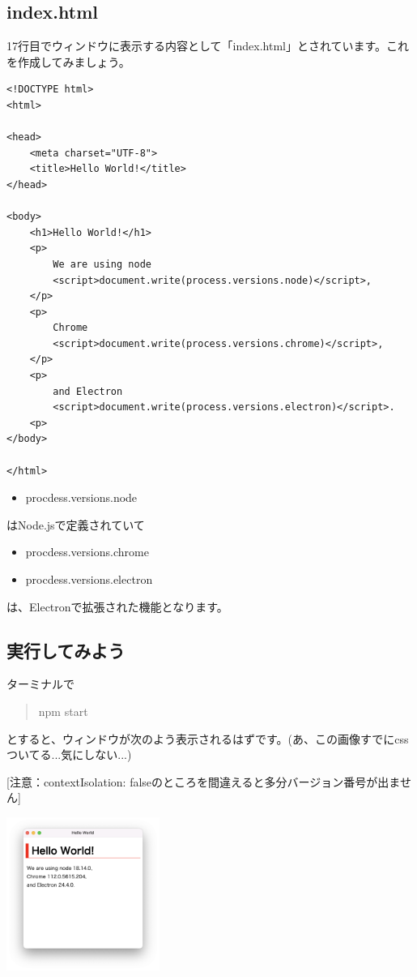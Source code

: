 \documentclass[mingoth,11pt,a4j,uplatex]{jsarticle}
\begin{document}
\subsection{index.html}
17行目でウィンドウに表示する内容として「index.html」とされています。これを作成してみましょう。

\begin{lstlisting}[caption=Hello World：index.html]
<!DOCTYPE html>
<html>

<head>
    <meta charset="UTF-8">
    <title>Hello World!</title>
</head>

<body>
    <h1>Hello World!</h1>
    <p>
        We are using node
        <script>document.write(process.versions.node)</script>,
    </p>
    <p>
        Chrome
        <script>document.write(process.versions.chrome)</script>,
    </p>
    <p>
        and Electron
        <script>document.write(process.versions.electron)</script>.
    <p>
</body>

</html>
\end{lstlisting}

\begin{itemize}
\item procdess.versions.node
\end{itemize}
はNode.jsで定義されていて
\begin{itemize}
\item procdess.versions.chrome
\item procdess.versions.electron
\end{itemize}
は、Electronで拡張された機能となります。

\subsection{実行してみよう}
ターミナルで
\begin{quote}
npm start
\end{quote}
とすると、ウィンドウが次のよう表示されるはずです。(あ、この画像すでにcssついてる...気にしない...)

[注意：contextIsolation: falseのところを間違えると多分バージョン番号が出ません]

\includegraphics[width=5cm]{img/helloworld.png}
\end{document}
